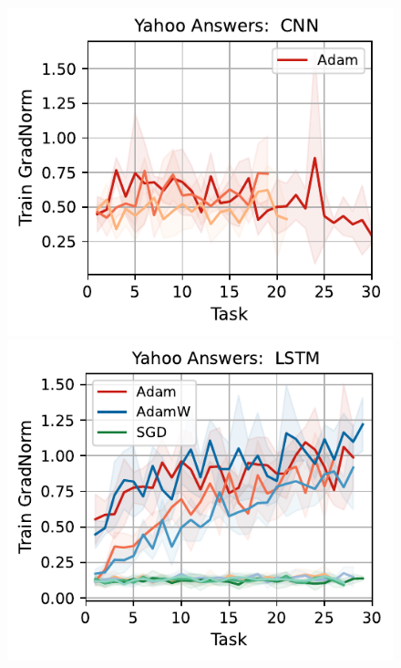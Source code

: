 \begin{figure}[htb!]
{        \includegraphics[width=\textwidth]{figs/GradNorm/nlp/cnn/yahoo_answers_50.pdf}
        \includegraphics[width=\textwidth]{figs/GradNorm/nlp/lstm/yahoo_answers_50.pdf}
}
\end{figure}
